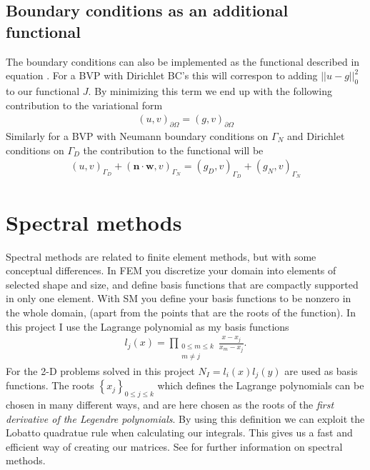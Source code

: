 \subsection{Boundary conditions as an additional functional}
The boundary conditions can also be implemented as the functional described in equation . For a BVP with Dirichlet BC's this will correspon to adding $||u-g||^2_0$ to our functional $J$. By minimizing this term we end up with the following contribution to the variational form
\begin{align}
	(u,v)_{\partial \Omega}=(g,v)_{\partial \Omega}
	\label{eq:BCFunctionalImplementationContribution}
\end{align}
Similarly for a BVP with Neumann boundary conditions on $\Gamma_N$ and Dirichlet conditions on $\Gamma_D$ the contribution to the functional will be
\begin{align}
	(u,v)_{\Gamma_D} + (\mathbf{n}\cdot \mathbf{w},v)_{\Gamma_N}=
	(g_D,v)_{\Gamma_D} + (g_N,v)_{\Gamma_N} 
	\label{eq:NeuDirFunctional}
\end{align}
\section{Spectral methods}
Spectral methods are related to finite element methods, but with some conceptual differences. In FEM you discretize your domain into elements of selected shape and size, and define basis functions that are compactly supported in only one element. With SM you define your basis functions to be nonzero in the whole domain, (apart from the points that are the roots of the function). In this project I use the Lagrange polynomial as my basis functions
%
\begin{align}
	l_j(x) = \prod_{\substack{0\leq m \leq k \\  m \neq j}} \frac{x-x_j}{x_m-x_j}.
	\label{eq:lagpolynomials}
\end{align}
For the 2-D problems solved in this project $N_I = l_i(x)l_j(y)$ are used as basis functions.
The roots $\left\{ x_j \right\}_{0\leq j \leq k}$ which defines the Lagrange polynomials can be chosen in many different ways, and are here chosen as the roots of the \textit{first derivative of the Legendre polynomials}. By using this definition we can exploit the Lobatto quadratue rule when calculating our integrals. This gives us a fast and efficient way of creating our matrices. See \cite{Canuto} for further information on spectral methods.
